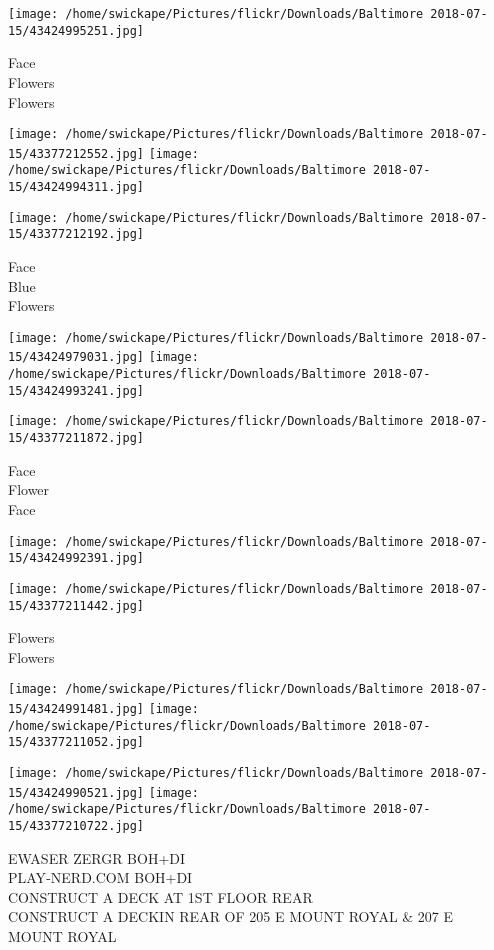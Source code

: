 \documentclass[10pt,letterpaper]{article}
\begin{document}
\vspace{0.25in}
\texttt{[image: /home/swickape/Pictures/flickr/Downloads/Baltimore 2018-07-15/43424995251.jpg]}

Face\\
Flowers\\
Flowers
\pagebreak

\texttt{[image: /home/swickape/Pictures/flickr/Downloads/Baltimore 2018-07-15/43377212552.jpg]}
\texttt{[image: /home/swickape/Pictures/flickr/Downloads/Baltimore 2018-07-15/43424994311.jpg]}

\vspace{0.25in}
\texttt{[image: /home/swickape/Pictures/flickr/Downloads/Baltimore 2018-07-15/43377212192.jpg]}

Face\\
Blue\\
Flowers
\pagebreak

\texttt{[image: /home/swickape/Pictures/flickr/Downloads/Baltimore 2018-07-15/43424979031.jpg]}
\texttt{[image: /home/swickape/Pictures/flickr/Downloads/Baltimore 2018-07-15/43424993241.jpg]}

\texttt{[image: /home/swickape/Pictures/flickr/Downloads/Baltimore 2018-07-15/43377211872.jpg]}

Face\\
Flower\\
Face
\pagebreak

\texttt{[image: /home/swickape/Pictures/flickr/Downloads/Baltimore 2018-07-15/43424992391.jpg]}

\vspace{0.25in}
\texttt{[image: /home/swickape/Pictures/flickr/Downloads/Baltimore 2018-07-15/43377211442.jpg]}

Flowers\\
Flowers
\pagebreak

\texttt{[image: /home/swickape/Pictures/flickr/Downloads/Baltimore 2018-07-15/43424991481.jpg]}
\texttt{[image: /home/swickape/Pictures/flickr/Downloads/Baltimore 2018-07-15/43377211052.jpg]}

\texttt{[image: /home/swickape/Pictures/flickr/Downloads/Baltimore 2018-07-15/43424990521.jpg]}
\texttt{[image: /home/swickape/Pictures/flickr/Downloads/Baltimore 2018-07-15/43377210722.jpg]}

EWASER ZERGR BOH+DI\\
PLAY{-}NERD.COM BOH+DI\\
CONSTRUCT A DECK AT 1ST FLOOR REAR\\
CONSTRUCT A DECKIN REAR OF 205 E MOUNT ROYAL \& 207 E MOUNT ROYAL
\pagebreak
\end{document}
